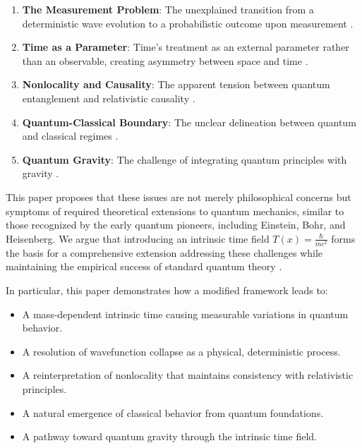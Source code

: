 \documentclass[12pt,a4paper]{article}
\newcommand{\Tfield}{T(x)}
\begin{document}
	\begin{enumerate}
		\item \textbf{The Measurement Problem}: The unexplained transition from a deterministic wave evolution to a probabilistic outcome upon measurement \cite{vonNeumann1932, Wheeler1983}.
		
		\item \textbf{Time as a Parameter}: Time's treatment as an external parameter rather than an observable, creating asymmetry between space and time \cite{Pauli1980, Peres1980}.
		
		\item \textbf{Nonlocality and Causality}: The apparent tension between quantum entanglement and relativistic causality \cite{Bell1964, EPR1935, Aspect1982}.
		
		\item \textbf{Quantum-Classical Boundary}: The unclear delineation between quantum and classical regimes \cite{Joos1985, Zurek2003, Leggett2002}.
		
		\item \textbf{Quantum Gravity}: The challenge of integrating quantum principles with gravity \cite{Rovelli2004, Kiefer2007, Oriti2009}.
	\end{enumerate}
	
	This paper proposes that these issues are not merely philosophical concerns but symptoms of required theoretical extensions to quantum mechanics, similar to those recognized by the early quantum pioneers, including Einstein, Bohr, and Heisenberg. We argue that introducing an intrinsic time field $\Tfield = \frac{\hbar}{mc^2}$ forms the basis for a comprehensive extension addressing these challenges while maintaining the empirical success of standard quantum theory \cite{pascher_zeit_2025}.
	
	In particular, this paper demonstrates how a modified framework leads to:
	\begin{itemize}
		\item A mass-dependent intrinsic time causing measurable variations in quantum behavior.
		\item A resolution of wavefunction collapse as a physical, deterministic process.
		\item A reinterpretation of nonlocality that maintains consistency with relativistic principles.
		\item A natural emergence of classical behavior from quantum foundations.
		\item A pathway toward quantum gravity through the intrinsic time field.
	\end{itemize}
	
\end{document}
